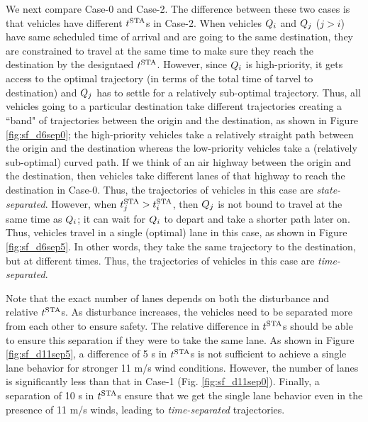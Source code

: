 We next compare Case-0 and Case-2. The difference between these two cases is that vehicles have different $t^\text{STA}$s in Case-2. When vehicles $Q_i$ and $Q_{j}$ ($j>i$) have same scheduled time of arrival and are going to the same destination, they are constrained to travel at the same time to make sure they reach the destination by the designtaed $t^\text{STA}$. However, since $Q_i$ is high-priority, it gets access to the optimal trajectory (in terms of the total time of tarvel to destination) and $Q_{j}$ has to settle for a relatively sub-optimal trajectory. Thus, all vehicles going to a particular destination take different trajectories creating a ``band" of trajectories between the origin and the destination, as shown in Figure \ref{fig:sf_d6sep0}; the high-priority vehicles take a relatively straight path between the origin and the destination whereas the low-priority vehicles take a (relatively sub-optimal) curved path. If we think of an air highway between the origin and the destination, then vehicles take different lanes of that highway to reach the destination in Case-0. Thus, the trajectories of vehicles in this case are \textit{state-separated}. However, when $t^\text{STA}_j > t^\text{STA}_i$, then $Q_j$ is not bound to travel at the same time as $Q_i$; it can wait for $Q_i$ to depart and take a shorter path later on. Thus, vehicles travel in a single (optimal) lane in this case, as shown in Figure \ref{fig:sf_d6sep5}. In other words, they take the same trajectory to the destination, but at different times. Thus, the trajectories of vehicles in this case are \textit{time-separated}. 

Note that the exact number of lanes depends on both the disturbance and relative $t^\text{STA}$s. As disturbance increases, the vehicles need to be separated more from each other to ensure safety. The relative difference in $t^\text{STA}$s should be able to ensure this separation if they were to take the same lane. As shown in Figure \ref{fig:sf_d11sep5}, a difference of 5 s in $t^\text{STA}$s is not sufficient to achieve a single lane behavior for stronger 11 m/s wind conditions. However, the number of lanes is significantly less than that in Case-1 (Fig. \ref{fig:sf_d11sep0}). Finally, a separation of 10 s in $t^\text{STA}$s ensure that we get the single lane behavior even in the presence of 11 m/s winds, leading to \textit{time-separated} trajectories. 


